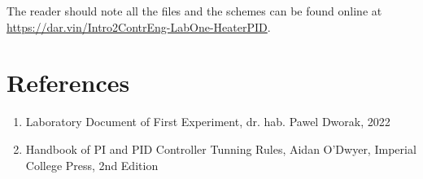 \documentclass[11pt,a4paper,twocolumn]{article}
\begin{document}
The reader should note all the files and the schemes can be found online at \url{https://dar.vin/Intro2ContrEng-LabOne-HeaterPID}.
\section{References}
\begin{enumerate}
    \item Laboratory Document of First Experiment, dr. hab. Pawel Dworak, 2022
    \item Handbook of PI and PID Controller Tunning Rules, Aidan O'Dwyer, Imperial College Press, 2nd Edition
\end{enumerate}
\end{document}
